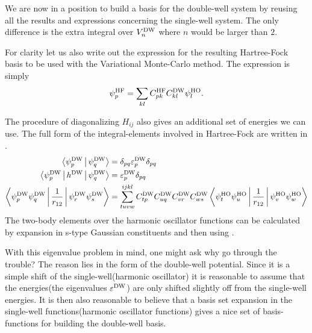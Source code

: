     We are now in a position to build a basis for the double-well system by
    reusing all the results and expressions concerning the single-well system.
    The only difference is the extra integral over $V^{\text{DW}}_n$ where $n$ would be
    larger than $2$.

    For clarity let us also write out the expression for the resulting
    Hartree-Fock basis to be used with the Variational Monte-Carlo method. The
    expression is simply
        \begin{equation}
            \psi^{\text{HF}}_p = \sum\limits_{kl}
            C^{\text{HF}}_{pk}C^{\text{DW}}_{kl}\psi^{\text{HO}}_l.
        \end{equation}

    The procedure of diagonalizing $H_{ij}$ also gives an additional set of
    energies we can use. The full form of the integral-elements involved in
    Hartree-Fock are written in .
        \begin{equation}
            \begin{aligned}
                \Braket{\psiDW_p|\psiDW_q} &= \delta_{pq}
                \varepsilon^{\text{DW}}_p\delta_{pq} \\
                \Braket{\psiDW_p|h^{\text{DW}}|\psiDW_q} &=
                \varepsilon^{\text{DW}}_p\delta_{pq} \\
                \Braket{\psiDW_p\psiDW_q|\frac{1}{r_{12}}|\psiDW_r\psiDW_s} &=
                \suml{tuvw}{ijkl} C^{\text{DW}}_{tp}C^{\text{DW}}_{uq}C^{\text{DW}}_{vr}C^{\text{DW}}_{ws}
                \Braket{\psiHO_t\psiHO_u|\frac{1}{r_{12}}|\psiHO_v\psiHO_w}
            \end{aligned}
            \label{eq:fullfinalsumary}
        \end{equation}
    The two-body elements over the harmonic oscillator functions can be
    calculated by expansion in s-type Gaussian constituents and then using
    .

    With this eigenvalue problem in mind, one might ask why go through the
    trouble? The reason lies in the form of the double-well potential. Since it
    is a simple shift of the single-well(harmonic oscillator) it is reasonable
    to assume that the energies(the eigenvalues $\varepsilon^{\text{DW}}$) are only
    shifted slightly off from the single-well energies. It is then also
    reasonable to believe that a basis set expansion in the single-well
    functions(harmonic oscillator functions) gives a nice set of
    basis-functions for building the double-well basis.

